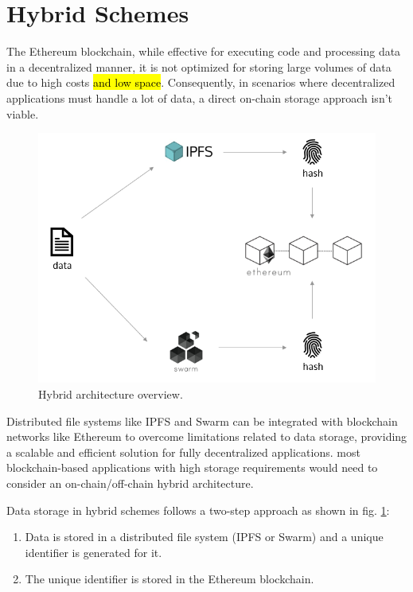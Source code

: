 \section{Hybrid Schemes}\label{sec:}
The Ethereum blockchain, while effective for executing code and processing data in a decentralized manner, it is not optimized for storing large volumes of data due to high costs \hl{and low space}. Consequently, in scenarios where decentralized applications must handle a lot of data, a direct on-chain storage approach isn't viable.

\begin{figure}[htbp]
\centerline{\includegraphics[width=12cm]{figs/hybrid.png}}
\caption{Hybrid architecture overview.}
\label{fig: hybrid}
\end{figure}

Distributed file systems like IPFS and Swarm can be integrated with blockchain networks like Ethereum to overcome limitations related to data storage, providing a scalable and efficient solution for fully decentralized applications.  most blockchain-based applications with high storage requirements would need to consider an on-chain/off-chain hybrid architecture.

Data storage in hybrid schemes follows a two-step approach as shown in fig. \ref{fig: hybrid}:
\begin{enumerate}
\item Data is stored in a distributed file system (IPFS or Swarm) and a unique identifier is generated for it.
\item The unique identifier is stored in the Ethereum blockchain.
\end{enumerate}

